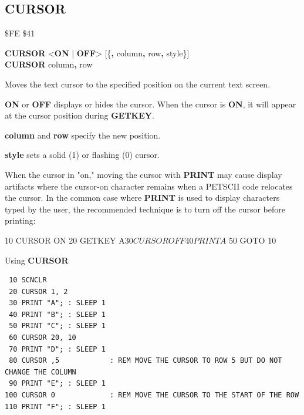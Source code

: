\subsection{CURSOR}
\begin{description}[leftmargin=2cm,style=nextline]
\item [Token:]   \$FE \$41

\item [Format:]  {\bf CURSOR} <{\bf ON} | {\bf OFF}> [\{{\bf,} column{\bf,} row{\bf,} style\}] \\
                 {\bf CURSOR} column{\bf,} row{\bf}

\item [Usage:]   Moves the text cursor to the specified position on the current text screen.

                 {\bf ON} or {\bf OFF} displays or hides the cursor. When the cursor is {\bf ON}, it will appear at the cursor position during {\bf GETKEY}.

                 {\bf column} and {\bf row} specify the new position.

                 {\bf style} sets a solid (1) or flashing (0) cursor.

\item [Remarks:] When the cursor in "on," moving the cursor with {\bf PRINT} may cause display artifacts where the cursor-on character remains when a PETSCII code relocates the cursor. In the common case where {\bf PRINT} is used to display characters typed by the user, the recommended technique is to turn off the cursor before printing:

\begin{basiccode}
 10 CURSOR ON
 20 GETKEY A$
 30 CURSOR OFF
 40 PRINT A$
 50 GOTO 10
\end{basiccode}

\item [Example:] Using {\bf CURSOR}
\begin{tcolorbox}[colback=black,coltext=white]
\verbatimfont{\codefont}
\begin{verbatim}
 10 SCNCLR
 20 CURSOR 1, 2
 30 PRINT "A"; : SLEEP 1
 40 PRINT "B"; : SLEEP 1
 50 PRINT "C"; : SLEEP 1
 60 CURSOR 20, 10
 70 PRINT "D"; : SLEEP 1
 80 CURSOR ,5            : REM MOVE THE CURSOR TO ROW 5 BUT DO NOT CHANGE THE COLUMN
 90 PRINT "E"; : SLEEP 1
100 CURSOR 0             : REM MOVE THE CURSOR TO THE START OF THE ROW
110 PRINT "F"; : SLEEP 1
\end{verbatim}
\end{tcolorbox}
\end{description}

